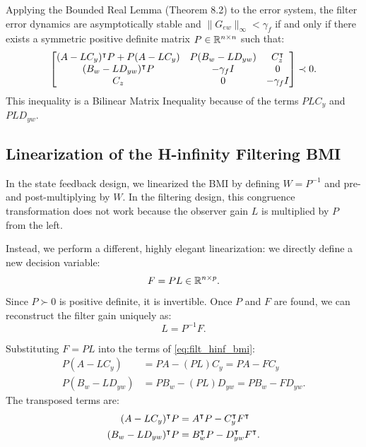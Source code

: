 Applying the Bounded Real Lemma (Theorem 8.2) to the error system, the filter error dynamics are asymptotically stable and $\| G_{ew} \|_\infty < \gamma_f$ if and only if there exists a symmetric positive definite matrix $P \in \mathbb{R}^{n \times n}$ such that:
\begin{equation}
    \begin{bmatrix} (A - L C_y)^\intercal P + P (A - L C_y) & P (B_w - L D_{yw}) & C_z^\intercal \\ (B_w - L D_{yw})^\intercal P & -\gamma_f I & 0 \\ C_z & 0 & -\gamma_f I \end{bmatrix} \prec 0 . \label{eq:filt_hinf_bmi}
\end{equation}
This inequality is a Bilinear Matrix Inequality because of the terms $P L C_y$ and $P L D_{yw}$.

\subsection{Linearization of the H-infinity Filtering BMI}
In the state feedback design, we linearized the BMI by defining $W = P^{-1}$ and pre- and post-multiplying by $W$. In the filtering design, this congruence transformation does not work because the observer gain $L$ is multiplied by $P$ from the left.

Instead, we perform a different, highly elegant linearization: we directly define a new decision variable:
\begin{equation}
    F = P L \in \mathbb{R}^{n \times p} . \label{eq:filt_change_var}
\end{equation}
Since $P \succ 0$ is positive definite, it is invertible. Once $P$ and $F$ are found, we can reconstruct the filter gain uniquely as:
\begin{equation}
    L = P^{-1} F . \label{eq:filt_reconstruct_gain}
\end{equation}

Substituting $F = P L$ into the terms of \eqref{eq:filt_hinf_bmi}:
\begin{align}
    P (A - L C_y) &= P A - (PL) C_y = P A - F C_y \\
P (B_w - L D_{yw}) &= P B_w - (PL) D_{yw} = P B_w - F D_{yw} .
\end{align}
The transposed terms are:
\begin{align}
    (A - L C_y)^\intercal P &= A^\intercal P - C_y^\intercal F^\intercal \\
(B_w - L D_{yw})^\intercal P &= B_w^\intercal P - D_{yw}^\intercal F^\intercal .
\end{align}

